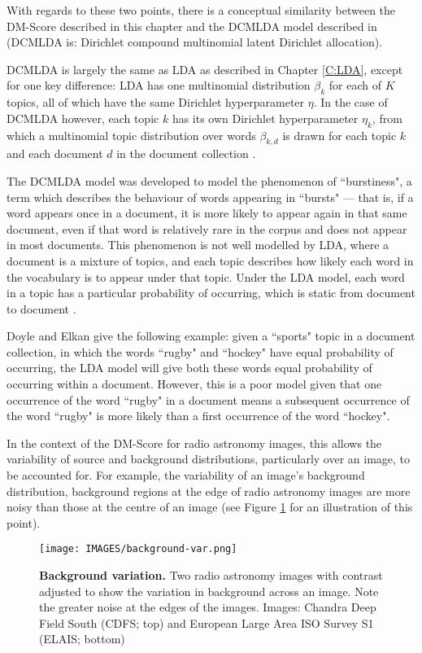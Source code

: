 With regards to these two points, there is a conceptual similarity between the DM-Score described in this chapter and the DCMLDA model described in \cite{doyle2009accounting,elkan2006clustering,madsen2005modeling} (DCMLDA is: Dirichlet compound multinomial latent Dirichlet allocation).

DCMLDA is largely the same as LDA as described in Chapter \ref{C:LDA}, except for one key difference: LDA has one multinomial distribution $\beta_k$ for each of $K$ topics, all of which have the same Dirichlet hyperparameter $\eta$. In the case of DCMLDA however, each topic $k$ has its own Dirichlet hyperparameter $\eta_k$, from which a multinomial topic distribution over words $\beta_{k,d}$ is drawn for each topic $k$ and each document $d$ in the document collection \cite{doyle2009accounting}.

The DCMLDA model was developed to model the phenomenon of ``burstiness", a term which describes the behaviour of words appearing in ``bursts" --- that is, if a word appears once in a document, it is more likely to appear again in that same document, even if that word is relatively rare in the corpus and does not appear in most documents. This phenomenon is not well modelled by LDA, where a document is a mixture of topics, and each topic describes how likely each word in the vocabulary is to appear under that topic. Under the LDA model, each word in a topic has a particular probability of occurring, which is static from document to document \cite{doyle2009accounting,elkan2006clustering,madsen2005modeling}.

Doyle and Elkan \cite{doyle2009accounting} give the following example: given a ``sports" topic in a document collection, in which the words ``rugby" and ``hockey" have equal probability of occurring, the LDA model will give both these words equal probability of occurring within a document. However, this is a poor model given that
one occurrence of the word ``rugby" in a document means a subsequent occurrence of the word ``rugby" is more likely than a first occurrence of the word ``hockey".

In the context of the DM-Score for radio astronomy images, this allows the variability of source and background distributions, particularly over an image, to be accounted for. For example, the variability of an image's background distribution, background regions at the edge of radio astronomy images are more noisy than those at the centre of an image (see Figure \ref{fig:background-var} for an illustration of this point).

\begin{figure}
\centering
\texttt{[image: IMAGES/background-var.png]}
\caption[Variation in background across an image]{\textbf{Background variation.} Two radio astronomy images with contrast adjusted to show the variation in background across an image. Note the greater noise at the edges of the images. Images: Chandra Deep Field South (CDFS; top) and European Large Area ISO Survey S1 (ELAIS; bottom) \cite{norris2006deep}}
\label{fig:background-var}
\end{figure}


